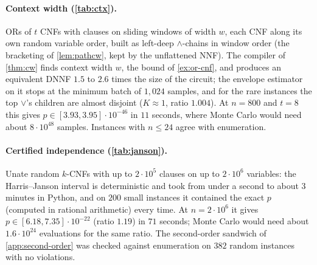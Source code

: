 \paragraph{Context width (\cref{tab:ctx}).} ORs of $t$ CNFs with clauses on
sliding windows of width $w$, each CNF along its own random variable order, built as
left-deep $\wedge$-chains in window order (the bracketing of \cref{lem:pathcw}, kept by
the unflattened NNF). The compiler of \cref{thm:cw} finds context width $w$, the bound
of \cref{ex:or-cnf}, and produces an equivalent DNNF $1.5$ to $2.6$ times the size of
the circuit; the envelope estimator on it stops at the minimum batch of $1{,}024$
samples, and for the rare instances the top $\vee$'s children are almost disjoint
($K\approx1$, ratio $1.004$). At $n=800$ and $t=8$ this gives
$p\in[3.93,3.95]\cdot10^{-46}$ in $11$ seconds, where Monte Carlo would need about
$8\cdot10^{48}$ samples. Instances with $n\le24$ agree with enumeration.

\begin{table}[ht]
\centering\scriptsize
{}
\caption{Context-width compilation of ORs of window-CNFs ($\eps=0.1$, $\delta=0.05$;
\texttt{exp\_ctx.py}). Time is compilation plus estimation.}
\label{tab:ctx}
\end{table}

\paragraph{Certified independence (\cref{tab:janson}).} Unate random $k$-CNFs with
up to $2\cdot10^5$ clauses on up to $2\cdot10^6$ variables: the Harris--Janson
interval is deterministic and took from under a second to about $3$ minutes in Python,
and on $200$ small instances it contained the exact $p$ (computed in rational arithmetic)
every time. At $n=2\cdot10^6$ it gives $p\in[6.18,7.35]\cdot10^{-22}$ (ratio $1.19$) in
$71$ seconds; Monte Carlo would need about $1.6\cdot10^{24}$ evaluations for the same
ratio. The second-order sandwich
of \cref{app:second-order} was checked against enumeration on $382$ random instances
with no violations.

\begin{table}[ht]
\centering\scriptsize
{}
\caption{Harris--Janson sandwich for random unate CNFs (\texttt{exp\_janson.py}).}
\label{tab:janson}
\end{table}

